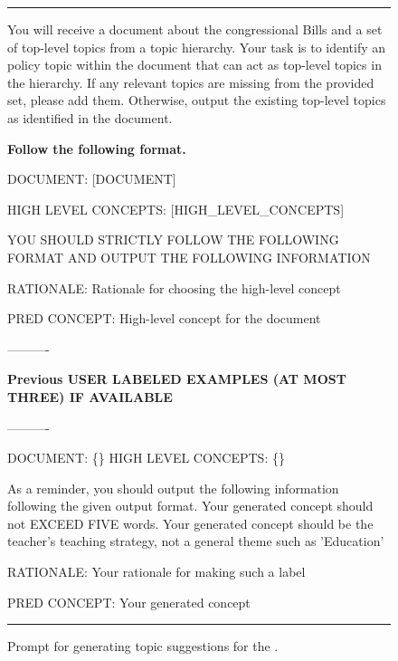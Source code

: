 \begin{figure}[t]
\centering
\begin{minipage}{\columnwidth}
\rule{\columnwidth}{0.4pt}  %

\vspace{0.5em}  %
\small
You will receive a document about the congressional Bills and a set of top-level topics from a topic hierarchy. Your task is to identify an policy topic within the document that can act as top-level topics in the hierarchy. If any relevant topics are missing from the provided set, please add them. Otherwise, output the existing top-level topics as identified in the document.

\medskip

\textbf{Follow the following format.}

DOCUMENT: [DOCUMENT]
\medskip

HIGH LEVEL CONCEPTS: [HIGH\_LEVEL\_CONCEPTS]
\medskip

YOU SHOULD STRICTLY FOLLOW THE FOLLOWING FORMAT AND OUTPUT THE FOLLOWING INFORMATION
\medskip

RATIONALE: Rationale for choosing the high-level concept
\medskip

PRED CONCEPT: High-level concept for the document

\medskip

----------

\textbf{Previous USER LABELED EXAMPLES (AT MOST THREE) IF AVAILABLE}

----------

\medskip

DOCUMENT: \{\}  HIGH LEVEL CONCEPTS: \{\}  

As a reminder, you should output the following information following the given output format. Your generated concept should not EXCEED FIVE words. Your generated concept should be the teacher's teaching strategy, not a general theme such as 'Education'

RATIONALE: Your rationale for making such a label

PRED CONCEPT: Your generated concept

\vspace{0.5em}  %
\rule{\columnwidth}{0.4pt}  %
\end{minipage}
\caption{Prompt for generating topic suggestions for the \bass{}.}
\label{fig:bass_prompt}
\end{figure}


